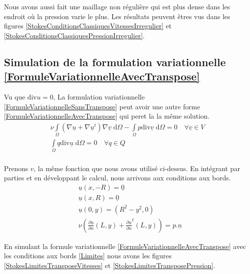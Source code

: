 \documentclass[11pt,a4paper]{article}
\numberwithin{equation}{subsection}
\numberwithin{figure}{subsection}
\begin{document}
Nous avons aussi fait une maillage non régulière qui est plus dense dans les endroit où la pression varie le plus. Les résultats peuvent êtres vus dans les figures \ref{StokesConditionsClassiquesVitessesIrregulier} et \ref{StokesConditionsClassiquesPressionIrregulier}.


\subsection{Simulation de la formulation variationnelle \ref{FormuleVariationnelleAvecTranspose}}

Vu que $\mathrm{div} u = 0$, La formulation variationnelle \ref{FormuleVariationnelleSansTranspose} peut avoir une autre forme \ref{FormuleVariationnelleAvecTranspose} qui peret la la même solution. 
\begin{equation}
\begin{aligned}
\nu \int\limits_\Omega \left(\nabla \underline{u} + \nabla \underline{u}^t\right) \nabla \underline{v} \;\mathrm{d}\Omega - \int\limits_\Omega p\mathrm{div}\underline{v} \; \mathrm{d}\Omega = 0\quad \forall \underline{v}\in V\\
\int\limits_\Omega q \mathrm{div} \underline{u} \;\mathrm{d}\Omega = 0 \quad \forall q \in Q\\
\label{FormuleVariationnelleAvecTranspose}
\end{aligned}
\end{equation}

Prenons $v$, la même fonction que nous avons utilisé ci-dessus. En intégrant par parties et en développant le calcul, nous arrivons aux conditions aux bords.
\begin{equation}
\begin{aligned}
& \underline{u}(x,-R) = \underline{0} \\
& \underline{u}(x, R) = \underline{0} \\
& \underline{u}(0,y) = \left(R^2 - y^2, 0\right) \\
& \nu\left(\frac{\partial\underline{u}}{\partial n}(L,y) + \frac{\partial\underline{u}}{\partial n}^t(L,y)\right) = p.\underline{n}
\end{aligned} \label{Limites}
\end{equation}

En simulant la formule variationnelle \ref{FormuleVariationnelleAvecTranspose} avec les conditions aux bords \ref{Limites} nous avons les figures \ref{StokesLimitesTransposeVitesses} et \ref{StokesLimitesTransposePression}.
\end{document}
